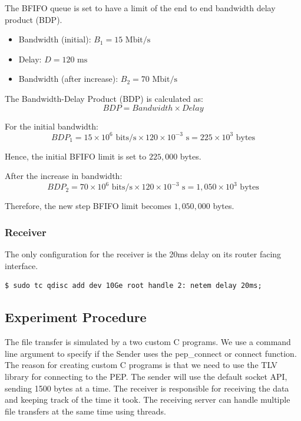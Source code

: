 \documentclass[a4paper,english, 12pt]{report}
\begin{document}
The BFIFO queue is set to have a limit of the end to end bandwidth delay product (BDP).\\
\begin{itemize}
    \item Bandwidth (initial): \( B_1 = 15 \text{ Mbit/s} \)
    \item Delay: \( D = 120 \text{ ms} \)
    \item Bandwidth (after increase): \( B_2 = 70 \text{ Mbit/s} \)
\end{itemize}

The Bandwidth-Delay Product (BDP) is calculated as:
\begin{equation}
    BDP = Bandwidth \times Delay
\end{equation}

For the initial bandwidth:
\begin{equation}
    BDP_1 = 15 \times 10^6 \text{ bits/s} \times 120 \times 10^{-3} \text{ s} = 225 \times 10^3 \text{ bytes}
\end{equation}

Hence, the initial BFIFO limit is set to \( 225,000 \) bytes.

After the increase in bandwidth:
\begin{equation}
    BDP_2 = 70 \times 10^6 \text{ bits/s} \times 120 \times 10^{-3} \text{ s} = 1,050 \times 10^3 \text{ bytes}
\end{equation}

Therefore, the new step BFIFO limit becomes \( 1,050,000 \) bytes.

\subsubsection{Receiver}
The only configuration for the receiver is the 20ms delay on its router facing interface.
\begin{verbatim}
$ sudo tc qdisc add dev 10Ge root handle 2: netem delay 20ms;
\end{verbatim}


\subsection{Experiment Procedure}
The file transfer is simulated by a two custom C programs. We use a command line argument to specify if the Sender uses the pep\_connect or connect function. The reason for creating custom C programs is that we need to use the TLV library for connecting to the PEP. The sender will use the default socket API, sending 1500 bytes at a time. The receiver is responsible for receiving the data and keeping track of the time it took. The receiving server can handle multiple file transfers at the same time using threads.\\
\end{document}
